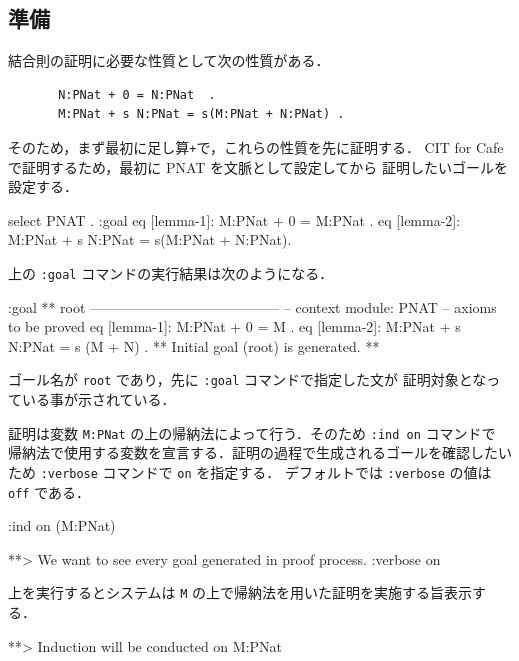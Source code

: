 \documentclass[a4paper,oneside,10pt,here]{memoir}
\newenvironment{vvtm}%
{\parskip=0pt\lineskip=0pt\begin{center}\begin{minipage}{0.8\textwidth}\begin{snugshade}}%
  {\end{snugshade}\end{minipage}\end{center}}
\begin{document}
\subsection{準備}

結合則の証明に必要な性質として次の性質がある．

\begin{verbatim}
       N:PNat + 0 = N:PNat  .
       M:PNat + s N:PNat = s(M:PNat + N:PNat) .
\end{verbatim}

そのため，まず最初に足し算\texttt{+}で，これらの性質を先に証明する．
CIT for Cafe で証明するため，最初に PNAT を文脈として設定してから
証明したいゴールを設定する．

\begin{vvtm}
\begin{simplev}
select PNAT .
:goal { eq [lemma-1]: M:PNat + 0 = M:PNat .
        eq [lemma-2]: M:PNat + s N:PNat = s(M:PNat + N:PNat). }
\end{simplev}
\end{vvtm}

上の \texttt{:goal} コマンドの実行結果は次のようになる．
\begin{vvtm}
  \begin{simplev}
:goal { ** root -----------------------------------------
  -- context module: PNAT
  -- axioms to be proved
    eq [lemma-1]: M:PNat + 0 = M .
    eq [lemma-2]: M:PNat + s N:PNat = s (M + N) .
}
** Initial goal (root) is generated. **
  \end{simplev}
\end{vvtm}
ゴール名が \texttt{root} であり，先に \texttt{:goal} コマンドで指定した文が
証明対象となっている事が示されている．

証明は変数 \texttt{M:PNat} の上の帰納法によって行う．そのため \texttt{:ind on} コマンドで
帰納法で使用する変数を宣言する．証明の過程で生成されるゴールを確認したいため
\texttt{:verbose} コマンドで \texttt{on} を指定する．
デフォルトでは \texttt{:verbose} の値は \texttt{off} である．
\begin{vvtm}
\begin{simplev}
:ind on (M:PNat)

**> We want to see every goal generated in proof process.
:verbose on 
\end{simplev}
\end{vvtm}
上を実行するとシステムは \texttt{M} の上で帰納法を用いた証明を実施する旨表示する．
\begin{vvtm}
  \begin{simplev}
    **> Induction will be conducted on M:PNat 
  \end{simplev}
\end{vvtm}
\end{document}
